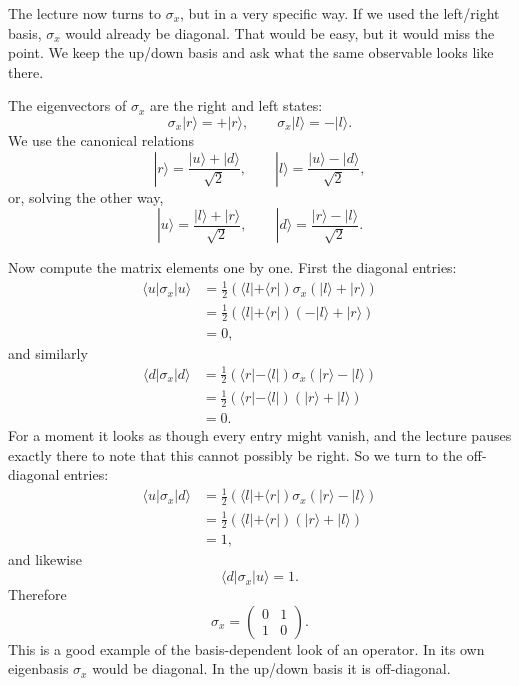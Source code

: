 The lecture now turns to \(\sigma_x\), but in a very specific way. If we used the left/right basis, \(\sigma_x\) would already be diagonal. That would be easy, but it would miss the point. We keep the up/down basis and ask what the same observable looks like there.

The eigenvectors of \(\sigma_x\) are the right and left states:
\begin{equation}
\sigma_x|r\rangle=+|r\rangle,
\qquad
\sigma_x|l\rangle=-|l\rangle.
\end{equation}
We use the canonical relations
\begin{equation}
|r\rangle=\frac{|u\rangle+|d\rangle}{\sqrt2},
\qquad
|l\rangle=\frac{|u\rangle-|d\rangle}{\sqrt2},
\end{equation}
or, solving the other way,
\begin{equation}
|u\rangle=\frac{|l\rangle+|r\rangle}{\sqrt2},
\qquad
|d\rangle=\frac{|r\rangle-|l\rangle}{\sqrt2}.
\end{equation}

Now compute the matrix elements one by one. First the diagonal entries:
\begin{align}
\langle u|\sigma_x|u\rangle
  &= \frac{1}{2}(\langle l|+\langle r|)\sigma_x(|l\rangle+|r\rangle) \\
  &= \frac{1}{2}(\langle l|+\langle r|)(-|l\rangle+|r\rangle) \\
  &= 0,
\end{align}
and similarly
\begin{align}
\langle d|\sigma_x|d\rangle
  &= \frac{1}{2}(\langle r|-\langle l|)\sigma_x(|r\rangle-|l\rangle) \\
  &= \frac{1}{2}(\langle r|-\langle l|)(|r\rangle+|l\rangle) \\
  &= 0.
\end{align}
For a moment it looks as though every entry might vanish, and the lecture pauses exactly there to note that this cannot possibly be right. So we turn to the off-diagonal entries:
\begin{align}
\langle u|\sigma_x|d\rangle
  &= \frac{1}{2}(\langle l|+\langle r|)\sigma_x(|r\rangle-|l\rangle) \\
  &= \frac{1}{2}(\langle l|+\langle r|)(|r\rangle+|l\rangle) \\
  &= 1,
\end{align}
and likewise
\begin{equation}
\langle d|\sigma_x|u\rangle=1.
\end{equation}
Therefore
\begin{equation}
\sigma_x=
\begin{pmatrix}
0 & 1 \\
1 & 0
\end{pmatrix}.
\end{equation}
This is a good example of the basis-dependent look of an operator. In its own eigenbasis \(\sigma_x\) would be diagonal. In the up/down basis it is off-diagonal.

